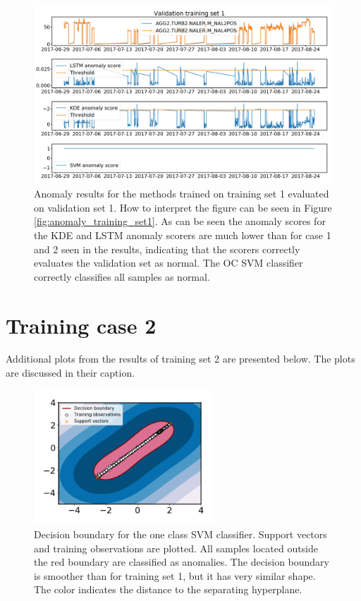     \begin{figure}
        \centering
        \includegraphics[width=\textwidth]{report/figures/analysis/plant1_training/test_data_anomaly.png}
        \caption{Anomaly results for the methods trained on training set 1 evaluated on validation set 1. How to interpret the figure can be seen in Figure \ref{fig:anomaly_training_set1}. As can be seen the anomaly scores for the KDE and LSTM anomaly scorers are much lower than for case 1 and 2 seen in the results, indicating that the scorers correctly evaluates the validation set as normal. The OC SVM classifier correctly classifies all samples as normal.}
    \end{figure}

\chapter{Training case 2}\label{appendix:training_case2}
    Additional plots from the results of training set 2 are presented below. The plots are discussed in their caption.
    
    
    \begin{figure}
        \centering
        \includegraphics[width=0.6\textwidth]{report/figures/analysis/plant2_train_short/svm_boundary.png}
        \caption{Decision boundary for the one class SVM classifier. Support vectors and training observations are plotted. All samples located outside the red boundary are classified as anomalies. The decision boundary is smoother than for training set 1, but it has very similar shape. The color indicates the distance to the separating hyperplane.}
    \end{figure}
    
